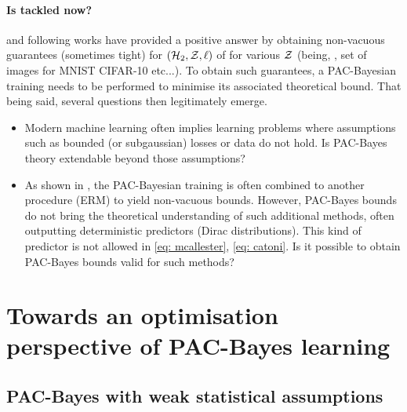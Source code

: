 \paragraph{Is  tackled now?}
\citep{dziugaite2017computing} and following works have provided a positive answer by obtaining non-vacuous guarantees (sometimes tight) for $(\mathcal{H}_2,\mathcal{Z},\ell)$ of  for various $\mathcal{Z}$ (being, \eg, set of images for MNIST CIFAR-10 etc...). To obtain such guarantees, a PAC-Bayesian training needs to be performed to minimise its associated theoretical bound. That being said, several questions then legitimately emerge.

\begin{itemize}
  \item Modern machine learning often implies learning problems where assumptions such as bounded (or subgaussian) losses or \iid data do not hold. Is PAC-Bayes theory extendable beyond those assumptions? 
  \item As shown in \citet{dziugaite2017computing}, the PAC-Bayesian training is often combined to another procedure (\eg ERM) to yield non-vacuous bounds. However, PAC-Bayes bounds do not bring the theoretical understanding of such additional methods, often outputting deterministic predictors (\ie Dirac distributions). This kind of predictor is not allowed in \eqref{eq: mcallester}, \eqref{eq: catoni}. Is it possible to obtain PAC-Bayes bounds valid for such methods? 
\end{itemize}




\section{Towards an optimisation perspective of PAC-Bayes learning}

\subsection*{PAC-Bayes with weak statistical assumptions}
